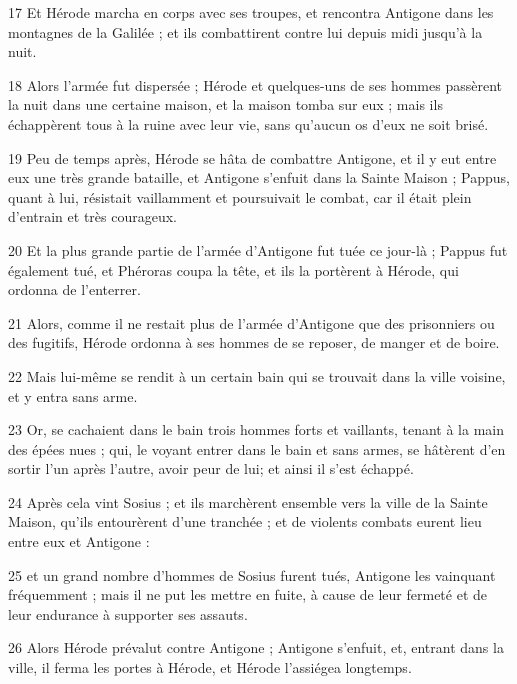 \par 17 Et Hérode marcha en corps avec ses troupes, et rencontra Antigone dans les montagnes de la Galilée ; et ils combattirent contre lui depuis midi jusqu'à la nuit.

\par 18 Alors l'armée fut dispersée ; Hérode et quelques-uns de ses hommes passèrent la nuit dans une certaine maison, et la maison tomba sur eux ; mais ils échappèrent tous à la ruine avec leur vie, sans qu'aucun os d'eux ne soit brisé.

\par 19 Peu de temps après, Hérode se hâta de combattre Antigone, et il y eut entre eux une très grande bataille, et Antigone s'enfuit dans la Sainte Maison ; Pappus, quant à lui, résistait vaillamment et poursuivait le combat, car il était plein d'entrain et très courageux.

\par 20 Et la plus grande partie de l'armée d'Antigone fut tuée ce jour-là ; Pappus fut également tué, et Phéroras coupa la tête, et ils la portèrent à Hérode, qui ordonna de l'enterrer.

\par 21 Alors, comme il ne restait plus de l'armée d'Antigone que des prisonniers ou des fugitifs, Hérode ordonna à ses hommes de se reposer, de manger et de boire.

\par 22 Mais lui-même se rendit à un certain bain qui se trouvait dans la ville voisine, et y entra sans arme.

\par 23 Or, se cachaient dans le bain trois hommes forts et vaillants, tenant à la main des épées nues ; qui, le voyant entrer dans le bain et sans armes, se hâtèrent d'en sortir l'un après l'autre, avoir peur de lui; et ainsi il s'est échappé.

\par 24 Après cela vint Sosius ; et ils marchèrent ensemble vers la ville de la Sainte Maison, qu'ils entourèrent d'une tranchée ; et de violents combats eurent lieu entre eux et Antigone :

\par 25 et un grand nombre d'hommes de Sosius furent tués, Antigone les vainquant fréquemment ; mais il ne put les mettre en fuite, à cause de leur fermeté et de leur endurance à supporter ses assauts.

\par 26 Alors Hérode prévalut contre Antigone ; Antigone s'enfuit, et, entrant dans la ville, il ferma les portes à Hérode, et Hérode l'assiégea longtemps.

